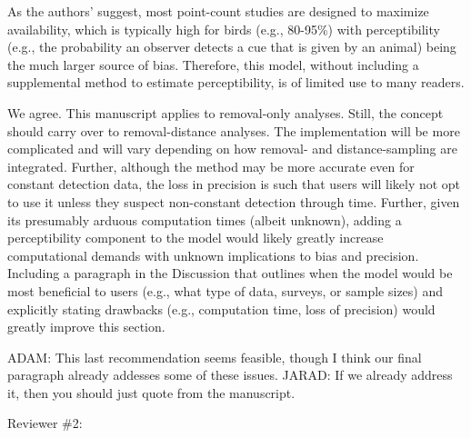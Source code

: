 \documentclass[12pt]{article}
\renewenvironment{quote}  %
              {\list{}{\rightmargin\leftmargin}\normalfont%
               \item\relax}
              {\endlist}
\newcommand{\adam}[1]{{\color{blue} ADAM: #1}}
\newcommand{\jarad}[1]{{\color{Orange} JARAD: #1}}
\begin{document}
As the authors’ suggest, most point-count studies are designed to maximize availability, which is typically high for birds (e.g., 80-95\%) with perceptibility (e.g., the probability an observer detects a cue that is given by an animal) being the much larger source of bias.  Therefore, this model, without including a supplemental method to estimate perceptibility, is of limited use to many readers.
\begin{quote}
We agree.
This manuscript applies to removal-only analyses.
Still, the concept should carry over to removal-distance analyses.
The implementation will be more complicated and will vary depending on how removal- and distance-sampling are integrated.
\end{quote}
Further, although the method may be more accurate even for constant detection data, the loss in precision is such that users will likely not opt to use it unless they suspect non-constant detection through time.  Further, given its presumably arduous computation times (albeit unknown), adding a perceptibility component to the model would likely greatly increase computational demands with unknown implications to bias and precision.  Including a paragraph in the Discussion that outlines when the model would be most beneficial to users (e.g., what type of data, surveys, or sample sizes) and explicitly stating drawbacks (e.g., computation time, loss of precision) would greatly improve this section.  
\begin{quote}
\adam{This last recommendation seems feasible, though I think our final paragraph already addesses some of these issues.}
\jarad{If we already address it, then you should just quote from the manuscript.}
\end{quote}
\vspace{1.5cm}

\newpage



Reviewer \#2:
\end{document}
